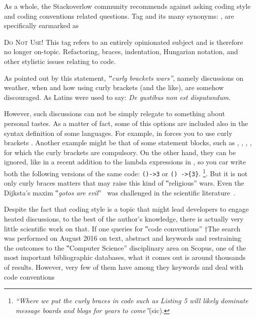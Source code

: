 As a whole, the Stackoverlow community
recommends against asking coding style and coding conventions related questions.
Tag  and its many synonyms: ,
 are specifically
earmarked as

\begin{tcolorbox}[colback=green!5!white,colframe=blue!25!white,notitle]
    \textsc{Do Not Use!}
This tag refers to an entirely opinionated subject and is therefore
no longer on-topic. Refactoring, braces, indentation, Hungarian notation, and
other stylistic issues relating to code.
\end{tcolorbox}

As pointed out by this statement, \emph{‟curly brackets wars”}, namely discussions
on weather, when and how using curly brackets (and the like), are somehow discouraged.
As Latins were used to say: \emph{De gustibus non est disputandum}.

However, such discussions can not be simply relegate to something about personal
tastes. 
As a matter of fact, some of this options are included also in the syntax definition of some languages.
For example, in \Go forces you to use curly brackets .
Another example might be that of some \Java statement blocks, such as , , ,
, for which the curly brackets are compulsory.
On the other hand, they can be ignored, like in a recent addition to
the lambda expressions 
in \Java, so you car write both the following versions of the same code: \texttt{()->3} or \texttt{() ->\{3\}}.
\footnote{
\emph{``Where we put the curly braces in code such as Listing 5 will likely dominate \Java message boards and blogs for years to come''}(sic).
}.
But it is not only curly braces matters that may raise
this kind of ‟religious” wars. Even the Dijksta's maxim ‟\emph{gotos are evil}”~\cite{Dijkstra:68} 
was challenged in the scientific literature~\cite{Knuth:74,Ramshaw:88,Bochmann:73,Sennesh:Gil:16,Zoethout:79,Wulf:79,Clark:84}.

Despite the fact that coding style is a topic that might lead developers to
engage heated discussions, to the best of the author's knowledge, there is
actually very little scientific work on that.
If one queries for ‟code conventions” †{The search was
performed on August 2016 on text, abstract and keywords and
restraining the outcomes to the ‟Computer Science” disciplinary area} on
Scopus, one of the most important bibliographic
databases, what it comes out is around thousands of results. However, very few of them have  among they keywords and deal with code conventions

